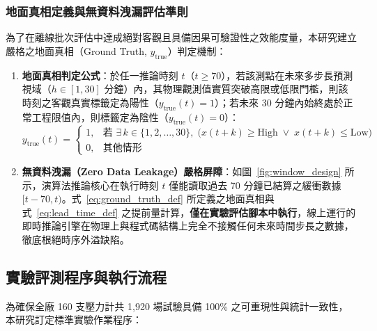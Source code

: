 \documentclass[fontset=none, a4paper, 12pt]{ctexart}
\begin{document}
\begin{doublespace}
\subsubsection{地面真相定義與無資料洩漏評估準則}
為了在離線批次評估中達成絕對客觀且具備因果可驗證性之效能度量，本研究建立嚴格之地面真相（Ground Truth, $y_{\mathrm{true}}$）判定機制：
\begin{enumerate}
    \item \textbf{地面真相判定公式}：於任一推論時刻 $t$（$t \ge 70$），若該測點在未來多步長預測視域（$h \in [1, 30]$ 分鐘）內，其物理觀測值實質突破高限或低限門檻，則該時刻之客觀真實標籤定為陽性（$y_{\mathrm{true}}(t) = 1$）；若未來 30 分鐘內始終處於正常工程限值內，則標籤定為陰性（$y_{\mathrm{true}}(t) = 0$）：
    \begin{equation}
        y_{\mathrm{true}}(t) = \begin{cases}
            1, & \text{若 } \exists\, k \in \{1, 2, \dots, 30\}, \; \bigl(x(t+k) \ge \mathrm{High} \;\lor\; x(t+k) \le \mathrm{Low}\bigr) \\
            0, & \text{其他情形}
        \end{cases}
        \label{eq:ground_truth_def}
    \end{equation}
    \item \textbf{無資料洩漏（Zero Data Leakage）嚴格屏障}：如圖~\ref{fig:window_design} 所示，演算法推論核心在執行時刻 $t$ 僅能讀取過去 70 分鐘已結算之緩衝數據 $[t-70, t)$。式~\eqref{eq:ground_truth_def} 所定義之地面真相與式~\eqref{eq:lead_time_def} 之提前量計算，\textbf{僅在實驗評估腳本中執行}，線上運行的即時推論引擎在物理上與程式碼結構上完全不接觸任何未來時間步長之數據，徹底根絕時序外溢缺陷。
\end{enumerate}

\subsection{實驗評測程序與執行流程}
\label{sec:exp_procedure}

為確保全廠 160 支壓力計共 1,920 場試驗具備 100\% 之可重現性與統計一致性，本研究訂定標準實驗作業程序：


\end{doublespace}
\end{document}

